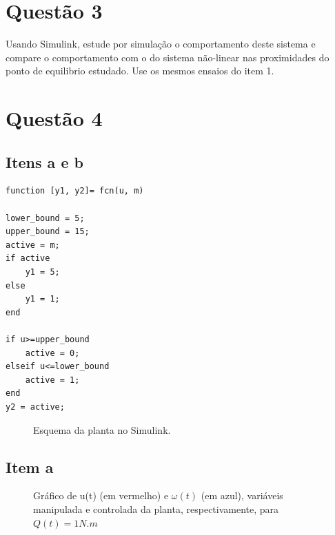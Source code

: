 \documentclass[11pt]{article}
\begin{document}
\section{Questão 3}
Usando Simulink, estude por simulação o comportamento deste sistema e compare o comportamento
com o do sistema não-linear nas proximidades do ponto de equilibrio estudado. Use os mesmos ensaios
do item 1.

\section{Questão 4}
\subsection{Itens a e b}
\begin{lstlisting}[caption={Código usado para controlar a planta},captionpos=b]
function [y1, y2]= fcn(u, m)

lower_bound = 5;
upper_bound = 15;
active = m;
if active
    y1 = 5;
else
    y1 = 1;
end

if u>=upper_bound
    active = 0;
elseif u<=lower_bound
    active = 1;
end
y2 = active;
\end{lstlisting}

\begin{figure}[!htb]
	\caption{Esquema da planta no Simulink.}
\end{figure}

\subsection{Item a}
\begin{figure}[!htb]
	\caption{Gráfico de u(t) (em vermelho) e $\omega(t)$ (em azul), variáveis manipulada e controlada da planta, respectivamente, para $Q(t) = 1 N.m$}
\end{figure}
\end{document}
